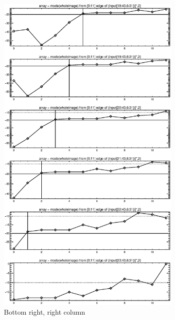 \documentclass[10pt]{article}
\begin{document}
\begin{figure}[!h]
    \centering 
    \hspace{-1.0in}
    \begin{subfigure}[b]{.4\linewidth}
        \centering
        \includegraphics[width=1.4\textwidth]{plots_tables_images/botright2.eps} 
        \caption{Bottom right, right column}
    \end{subfigure}
    \hspace{1.0in}
    \begin{subfigure}[b]{.4\linewidth}

\end{subfigure}
\end{figure}
\end{document}
